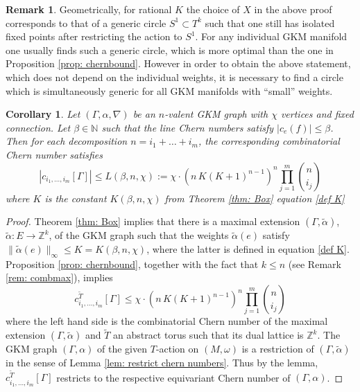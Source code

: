\documentclass[12pt,a4paper]{amsart}
\newcommand{\ZZ}{\mathbb{Z}}
\newcommand{\NN}{\mathbb{N}}
\newtheorem{cor}[thm]{Corollary}
\theoremstyle{plain}
\theoremstyle{definition}
\newtheorem{rem}[thm]{Remark}
\begin{document}
\begin{rem}
Geometrically, for rational $K$ the choice of $X$ in the above proof corresponds to that of a generic circle $S^1\subset T^k$ such that one still has isolated fixed points after restricting the action to $S^1$.
 For any individual GKM manifold one usually finds such a generic circle, which is more optimal than the one in Proposition \ref{prop: chernbound}. However in order to obtain the above statement, which does not depend on the individual weights, it is necessary to find a circle which is simultaneously generic for all GKM manifolds with ``small'' weights.
\end{rem}


\begin{cor}\label{thm: quantitative bound}
Let $(\Gamma,\alpha,\nabla)$ be an $n$-valent GKM graph with $\chi$ vertices and fixed connection. Let $\beta\in \NN$ such that the line Chern numbers satisfy $|c_e(f)|\leq \beta$.
Then for each decomposition $n=i_1+\ldots+i_m$, the corresponding combinatorial Chern number satisfies
\begin{equation}\label{eq def L}
|c_{i_1,\ldots,i_m}[\Gamma]|\leq L(\beta,n,\chi):= \chi\cdot (n\,K (K+1)^{n-1})^n\prod_{j=1}^m {n\choose i_j}
\end{equation}
where $K$ is the constant $K(\beta,n,\chi)$ from Theorem \ref{thm: Box} equation \eqref{def K}
\end{cor}


\begin{proof}

Theorem \ref{thm: Box} implies that there is a maximal extension $(\Gamma,\tilde{\alpha})$, $\tilde{\alpha}\colon E\rightarrow \ZZ^k$, of the GKM graph such that the weights $\tilde{\alpha}(e)$ satisfy $\|\tilde{\alpha}(e)\|_\infty\leq K=K(\beta,n,\chi)$, where the latter is defined in equation \eqref{def K}. Proposition \ref{prop: chernbound}, together with the fact that $k\leq n$ (see Remark \ref{rem: combmax}), implies
\[c^{\widetilde{T}}_{i_1,\ldots,i_m}[\Gamma]\leq\chi\cdot (n\,K (K+1)^{n-1})^n\prod_{j=1}^m {n\choose i_j}\]
where the left hand side is the combinatorial Chern number of the maximal extension $(\Gamma,\tilde{\alpha})$ and $\widetilde{T}$ an abstract torus such that 
its dual lattice is $\ZZ^k$. The GKM graph $(\Gamma,\alpha)$ of the given
$T$-action on $(M,\omega)$ is a restriction of $(\Gamma,\tilde{\alpha})$ in the sense of
Lemma \ref{lem: restrict chern numbers}. Thus by the lemma,
$c^{\widetilde{T}}_{i_1,\ldots,i_m}[\Gamma]$ restricts to the respective equivariant Chern
number of $(\Gamma,\alpha)$.


\end{proof}
\end{document}
